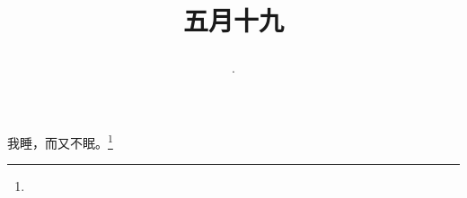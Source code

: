 \title{\date[d=24,m=6,y=2024][year:cn-y,年,month:cn,day:cn,日,·,weekday]·五月十九 }
我睡，而又不眠。\footnote{ }

